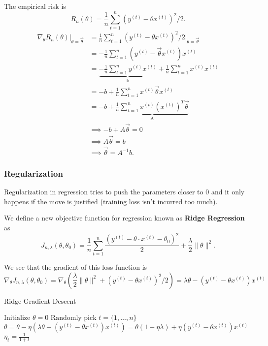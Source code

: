 \documentclass{article}
\begin{document}
The empirical risk is 
\[R_n(\theta)=\frac{1}{n}\sum\limits_{t=1}^n\left(y^{(t)}-\theta x^{(t)}\right)^2/2.\]
\begin{align*}
\nabla_\theta R_n(\theta)\big|_{\theta=\vec{\theta}}&=\frac{1}{n}\sum\limits_{t=1}^n\left(y^{(t)}-\theta x^{(t)}\right)^2/2\big|_{\theta=\vec{\theta}}\\ 
	&=-\frac{1}{n}\sum\limits_{t=1}^n\left(y^{(t)}-\vec{\theta} x^{(t)}\right)x^{(t)}\\
	&=\underbrace{-\frac{1}{n}\sum\limits_{t=1}^n y^{(t)}x^{(t)}}_{\text{b}}+\frac{1}{n}\sum\limits_{t=1}^n x^{(t)}x^{(t)}\\
	&=-b+\frac{1}{n}\sum\limits_{t=1}^n x^{(t)}\vec{\theta}x^{(t)}\\&=-b+\underbrace{\frac{1}{n}\sum\limits_{t=1}^n x^{(t)}\left(x^{(t)}\right)^T\vec{\theta}}_{\text{A}}\\
	&\implies -b+A\vec{\theta}=0\\
	&\implies A\vec{\theta}=b\\
	&\implies \vec{\theta}=A^{-1}b.
\end{align*}

\subsubsection{Regularization}
Regularization in regression tries to push the parameters closer to $0$ and it only happens if the move is justified (training loss isn't incurred too much).

We define a new objective function for regression known as \textbf{Ridge Regression} as
\[J_{n,\lambda}(\theta,\theta_0)=\frac{1}{n}\sum\limits_{t=1}^n\frac{\left(y^{(t)}-\theta\cdot x^{(t)}-\theta_0\right)^2}{2}+\frac{\lambda}{2}\lVert\theta\rVert^2.\]

We see that the gradient of this loss function is 
\[\nabla_\theta J_{n,\lambda}(\theta,\theta_0)=\nabla_\theta\left(\frac{\lambda}{2}\lVert\theta\rVert^2+\left(y^{(t)}-\theta x^{(t)}\right)^2/2\right)=\lambda\theta-\left(y^{(t)}-\theta x^{(t)}\right)x^{(t)}\]

\begin{algorithm}
	\caption{Ridge Gradient Descent}
	\begin{algorithmic}
	\State $\text{Initialize }\theta=0$
	\State $\text{Randomly pick }t=\{1,\ldots,n\}$
		\State $\theta=\theta-\eta\left(\lambda\theta-\left(y^{(t)}-\theta x^{(t)}\right)x^{(t)}\right)=\theta(1-\eta\lambda)+\eta\left(y^{(t)}-\theta x^{(t)}\right)x^{(t)}$
	\State  $\eta_t=\frac{1}{1+t}$
	\end{algorithmic}
\end{algorithm}
\end{document}
